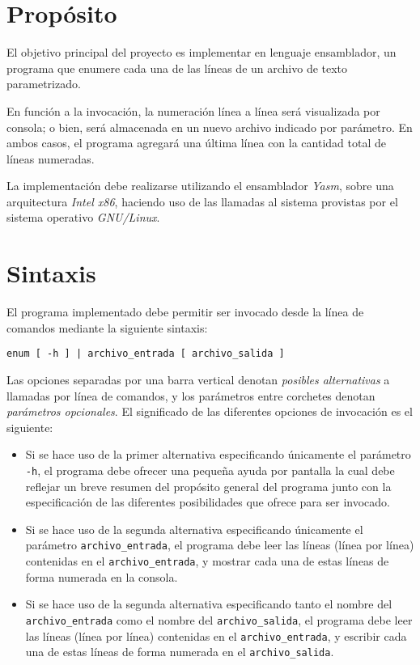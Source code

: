 \documentclass[12pt,a4paper]{article}
\begin{document}

\section*{Propósito}
El objetivo principal del proyecto es implementar en lenguaje ensamblador, un programa que enumere cada una de las líneas de un archivo de texto parametrizado.

En función a la invocación, la numeración línea a línea será visualizada por consola; o bien, será almacenada en un nuevo archivo indicado por parámetro. En ambos casos, el programa agregará una última línea con la cantidad total de líneas numeradas.

La implementación debe realizarse utilizando el ensamblador \textit{Yasm}, sobre una arquitectura \textit{Intel x86}, haciendo uso de las llamadas al sistema provistas por el sistema operativo \textit{GNU/Linux}.

\section*{Sintaxis}
El programa implementado debe permitir ser invocado desde la línea de comandos mediante la siguiente sintaxis:
\begin{center}
	\texttt{enum [ -h ] | archivo\_entrada [ archivo\_salida ]}
\end{center}

Las opciones separadas por una barra vertical denotan \textit{posibles alternativas} a llamadas por línea de comandos, y los parámetros entre corchetes denotan \textit{parámetros opcionales}. El significado de las diferentes opciones de invocación es el siguiente:
\begin{itemize}
	\item Si se hace uso de la primer alternativa especificando únicamente el parámetro \texttt{-h}, el programa debe ofrecer una pequeña ayuda por pantalla la cual debe reflejar un breve resumen del propósito general del programa junto con la especificación de las diferentes posibilidades que ofrece para ser invocado.
	\item Si se hace uso de la segunda alternativa especificando únicamente el parámetro \texttt{archivo\_entrada}, el programa debe leer las líneas (línea por línea) contenidas en el \texttt{archivo\_entrada}, y mostrar cada una de estas líneas de forma numerada en la consola. 
	\item Si se hace uso de la segunda alternativa especificando tanto el nombre del \texttt{archivo\_entrada} como el nombre del \texttt{archivo\_salida}, el programa debe leer las líneas (línea por línea) contenidas en el \texttt{archivo\_entrada}, y escribir cada una de estas líneas de forma numerada en el \texttt{archivo\_salida}.
\end{itemize}
	
\end{document}
